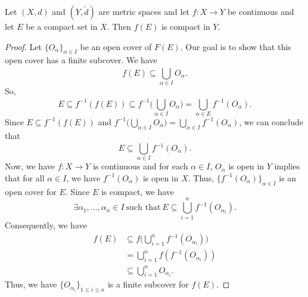 \documentclass[a4paper]{article}
\begin{document}
\begin{theorem}
    Let \( (X,d) \) and \( (Y, \tilde{d}) \) are metric spaces and let \( f: X \to Y  \) be continuous and let \( E  \) be a compact set in \( X  \). Then \( f(E) \) is compact in \( Y  \). 
\end{theorem}
\begin{proof}
    Let \( \{ {O}_{\alpha} \}_{\alpha \in I} \) be an open cover of \( F(E) \). Our goal is to show that this open cover has a finite subcover. We have
    \[  f(E) \subseteq \bigcup_{ \alpha \in I  }^{  }  {O}_{\alpha}. \]
    So, 
    \[  E \subseteq f^{-1}(f(E)) \subseteq f^{-1} \Big(  \bigcup_{ \alpha \in I  }^{  } {O}_{\alpha} \Big) = \bigcup_{ \alpha \in E  }^{  }  f^{-1}({O}_{\alpha}). \]
    Since \( E \subseteq  f^{-1}(f(E)) \) and \( f^{-1} \Big(  \bigcup_{ \alpha \in I  }^{  }  {O}_{\alpha} \Big) = \bigcup_{ \alpha \in I  }^{  }  f^{-1}({O}_{\alpha}) \), we can conclude that 
    \[  E \subseteq  \bigcup_{ \alpha \in I  }^{  }  f^{-1}({O}_{\alpha}). \]
    Now, we have \( f: X \to Y  \) is continuous and for each \( \alpha \in I  \), \( {O}_{\alpha} \) is open in \( Y  \) implies that for all \(  \alpha \in I  \), we have \( f^{-1}({O}_{\alpha}) \) is open in \( X  \). Thus, \( \{ f^{-1}({O}_{\alpha}) \}_{\alpha \in I} \) is an open cover for \( E \). Since \( E  \) is compact, we have   
    \[  \exists {\alpha}_{1}, \dots, {\alpha}_{n} \in I \ \text{such that} \ E \subseteq \bigcup_{ i=1  }^{ n }  f^{-1}({O}_{{\alpha}_{i}}).   \]
    Consequently, we have 
    \begin{align*}
        f(E) &\subseteq  f \Big(  \bigcup_{ i=1  }^{ n }  f^{-1}({O}_{{\alpha}_{i}}) \Big) \\
            &= \bigcup_{ i=1  }^{ n }  f(f^{-1}({O}_{{\alpha}_{i}})) \\
            &\subseteq \bigcup_{ i=1  }^{ n }  {O}_{{\alpha}_{i}}.
\end{align*}
Thus, we have \( \{ {O}_{{\alpha}_{i}} \}_{1 \leq i \leq n} \) is a finite subcover for \( f(E) \).
\end{proof}
\end{document}
